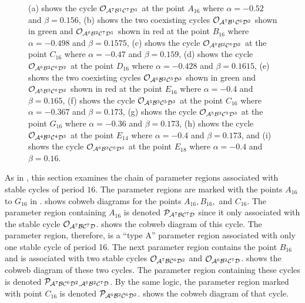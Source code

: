 \begin{figure}
{		(a) shows the cycle $\mathcal{O}_{\mathcal{A}^7\mathcal{B}^1\mathcal{C}^7\mathcal{D}^1}$ at the point $A_{16}$ where $\alpha = -0.52$ and $\beta = 0.156$,
		(b) shows the two coexisting cycles $\mathcal{O}_{\mathcal{A}^7\mathcal{B}^1\mathcal{C}^6\mathcal{D}^2}$ shown in green and $\mathcal{O}_{\mathcal{A}^6\mathcal{B}^2\mathcal{C}^7\mathcal{D}^1}$ shown in red at the point $B_{16}$ where $\alpha = -0.498$ and $\beta = 0.1575$,
		(c) shows the cycle $\mathcal{O}_{\mathcal{A}^6\mathcal{B}^2\mathcal{C}^6\mathcal{D}^2}$ at the point $C_{16}$ where $\alpha = -0.47$ and $\beta = 0.159$,
		(d) shows the cycle $\mathcal{O}_{\mathcal{A}^6\mathcal{B}^2\mathcal{C}^6\mathcal{D}^2}$ at the point $D_{16}$ where $\alpha = -0.428$ and $\beta = 0.1615$,
		(e) shows the two coexisting cycles $\mathcal{O}_{\mathcal{A}^6\mathcal{B}^2\mathcal{C}^5\mathcal{D}^3}$ shown in green and $\mathcal{O}_{\mathcal{A}^5\mathcal{B}^3\mathcal{C}^6\mathcal{D}^2}$ shown in red at the point $E_{16}$ where $\alpha = -0.4$ and $\beta = 0.165$,
		(f) shows the cycle $\mathcal{O}_{\mathcal{A}^5\mathcal{B}^3\mathcal{C}^5\mathcal{D}^3}$ at the point $C_{16}$ where $\alpha = -0.367$ and $\beta = 0.173$,
		(g) shows the cycle $\mathcal{O}_{\mathcal{A}^5\mathcal{B}^3\mathcal{C}^5\mathcal{D}^3}$ at the point $G_{16}$ where $\alpha = -0.36$ and $\beta = 0.173$,
		(h) shows the cycle $\mathcal{O}_{\mathcal{A}^4\mathcal{B}^3\mathcal{C}^4\mathcal{D}^3}$ at the point $E_{14}$ where $\alpha = -0.4$ and $\beta = 0.173$,
		and (i) shows the cycle $\mathcal{O}_{\mathcal{A}^6\mathcal{B}^3\mathcal{C}^6\mathcal{D}^3}$ at the point $E_{18}$ where $\alpha = -0.4$ and $\beta = 0.16$.
	}
	\label{fig:arch.dyn.cobwebs}
\end{figure}

As in \cite{akyuz2022}, this section examines the chain of parameter regions associated with stable cycles of period $16$.
The parameter regions are marked with the points $A_{16}$ to $G_{16}$ in .
 shows cobweb diagrams for the points $A_{16}, B_{16},$ and $C_{16}$.
The parameter region containing $A_{16}$ is denoted $\mathcal{P}_{\mathcal{A}^7\mathcal{B}\mathcal{C}^7\mathcal{D}}$ since it only associated with the stable cycle $\mathcal{O}_{\mathcal{A}^7\mathcal{B}\mathcal{C}^7\mathcal{D}}$.
 shows the cobweb diagram of this cycle.
The parameter region, therefore, is a ``type A'' parameter region associated with only one stable cycle of period 16.
The next parameter region contains the point $B_{16}$ and is associated with two stable cycles $\mathcal{O}_{\mathcal{A}^7\mathcal{B}\mathcal{C}^6\mathcal{D}^2}$ and $\mathcal{O}_{\mathcal{A}^6\mathcal{B}^2\mathcal{C}^7\mathcal{D}}$.
 shows the cobweb diagram of these two cycles.
The parameter region containing these cycles is denoted $\mathcal{P}_{\mathcal{A}^7\mathcal{B}\mathcal{C}^6\mathcal{D}^2, \mathcal{A}^6\mathcal{B}^2\mathcal{C}^7\mathcal{D}}$.
By the same logic, the parameter region marked with point $C_{16}$ is denoted $\mathcal{P}_{\mathcal{A}^6\mathcal{B}^2\mathcal{C}^6\mathcal{D}^2}$.
 shows the cobweb diagram of that cycle.


